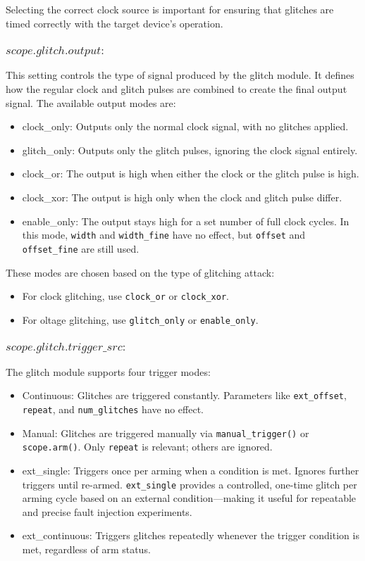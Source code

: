 Selecting the correct clock source is important for ensuring that glitches are timed correctly with the target device’s operation.
\subsubsection{$scope.glitch.output :$}
This setting controls the type of signal produced by the glitch module. It defines how the regular clock and glitch pulses are combined to create the final output signal.
The available output modes are:

\begin{itemize}
  \item clock\_only: Outputs only the normal clock signal, with no glitches applied.
  \item glitch\_only: Outputs only the glitch pulses, ignoring the clock signal entirely.
  \item clock\_or: The output is high when either the clock or the glitch pulse is high.
  \item clock\_xor: The output is high only when the clock and glitch pulse differ.
  \item enable\_only: The output stays high for a set number of full clock cycles. In this mode, \texttt{width} and \texttt{width\_fine} have no effect, but \texttt{offset} and \texttt{offset\_fine} are still used.
\end{itemize}

These modes are chosen based on the type of glitching attack:
\begin{itemize}
    \item For clock glitching, use \texttt{clock\_or} or \texttt{clock\_xor}.
    \item For oltage glitching, use \texttt{glitch\_only} or \texttt{enable\_only}.
  \end{itemize}

\subsubsection{$scope.glitch.trigger\_src :$}    
The glitch module supports four trigger modes:

\begin{itemize}
    \item Continuous: Glitches are triggered constantly. Parameters like \texttt{ext\_offset}, \texttt{repeat}, and \texttt{num\_glitches} have no effect.
    
    \item Manual: Glitches are triggered manually via \texttt{manual\_trigger()} or \texttt{scope.arm()}. Only \texttt{repeat} is relevant; others are ignored.
    
    \item ext\_single: Triggers once per arming when a condition is met. Ignores further triggers until re-armed. \texttt{ext\_single} provides a controlled, one-time glitch per arming cycle based on an external condition—making it useful for repeatable and precise fault injection experiments.
    
    \item ext\_continuous: Triggers glitches repeatedly whenever the trigger condition is met, regardless of arm status.
\end{itemize}
